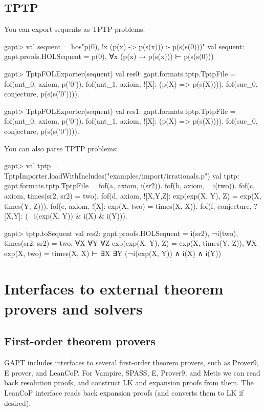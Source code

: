 \documentclass[a4paper,11pt]{book}
\begin{document}
\section{TPTP}
You can export sequents as TPTP problems:
\begin{clilisting}
gapt> val sequent = hos"p(0), !x (p(x) -> p(s(x))) :- p(s(s(0)))"
val sequent: gapt.proofs.HOLSequent = p(0), ∀x (p(x) → p(s(x))) ⊢ p(s(s(0)))

gapt> TptpFOLExporter(sequent)
val res0: gapt.formats.tptp.TptpFile =
fof(ant_0, axiom, p('0')).
fof(ant_1, axiom, ![X]: (p(X) => p(s(X)))).
fof(suc_0, conjecture, p(s(s('0')))).

gapt> TptpFOLExporter(sequent)
val res1: gapt.formats.tptp.TptpFile =
fof(ant_0, axiom, p('0')).
fof(ant_1, axiom, ![X]: (p(X) => p(s(X)))).
fof(suc_0, conjecture, p(s(s('0')))).

\end{clilisting}

You can also parse TPTP problems:
\begin{clilisting}
gapt> val tptp = TptpImporter.loadWithIncludes("examples/import/irrationals.p")
val tptp: gapt.formats.tptp.TptpFile =
fof(a, axiom, i(sr2)).
fof(b, axiom, ~ i(two)).
fof(c, axiom, times(sr2, sr2) = two).
fof(d, axiom, ![X,Y,Z]: exp(exp(X, Y), Z) = exp(X, times(Y, Z))).
fof(e, axiom, ![X]: exp(X, two) = times(X, X)).
fof(f, conjecture, ?[X,Y]: (~ i(exp(X, Y)) & i(X) & i(Y))).

gapt> tptp.toSequent
val res2: gapt.proofs.HOLSequent =
i(sr2),
¬i(two),
times(sr2, sr2) = two,
∀X ∀Y ∀Z exp(exp(X, Y), Z) = exp(X, times(Y, Z)),
∀X exp(X, two) = times(X, X)
⊢
∃X ∃Y (¬i(exp(X, Y)) ∧ i(X) ∧ i(Y))

\end{clilisting}

\chapter{Interfaces to external theorem provers and solvers}


\section{First-order theorem provers}\label{sec:fol_provers}

GAPT includes interfaces to several first-order theorem provers, such as
Prover9, E prover, and LeanCoP.  For Vampire, SPASS, E, Prover9, and Metis we can read back
resolution proofs, and construct LK and expansion proofs from them.  The
LeanCoP interface reads back expansion proofs (and converts them to LK if desired).
\end{document}
